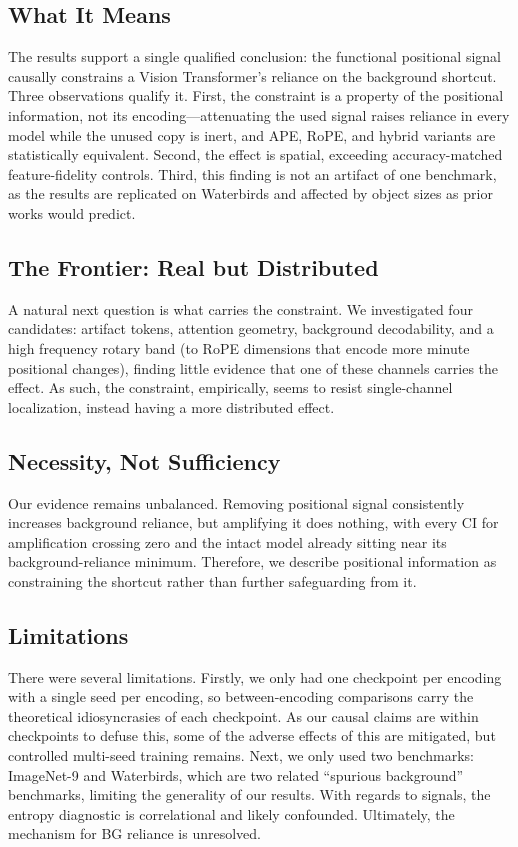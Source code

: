 \documentclass[10pt,twocolumn,letterpaper]{article}
\begin{document}
\subsection{What It Means}
The results support a single qualified conclusion: the functional positional signal causally constrains a Vision Transformer's reliance on the background shortcut. Three observations qualify it. First, the constraint is a property of the positional information, not its encoding---attenuating the used signal raises reliance in every model while the unused copy is inert, and APE, RoPE, and hybrid variants are statistically equivalent. Second, the effect is spatial, exceeding accuracy-matched feature-fidelity controls. Third, this finding is not an artifact of one benchmark, as the results are replicated on Waterbirds and affected by object sizes as prior works would predict.

\subsection{The Frontier: Real but Distributed}
A natural next question is what carries the constraint. We investigated four candidates: artifact tokens, attention geometry, background decodability, and a high frequency rotary band (to RoPE dimensions that encode more minute positional changes), finding little evidence that one of these channels carries the effect. As such, the constraint, empirically, seems to resist single-channel localization, instead having a more distributed effect.

\subsection{Necessity, Not Sufficiency}
Our evidence remains unbalanced. Removing positional signal consistently increases background reliance, but amplifying it does nothing, with every CI for amplification crossing zero and the intact model already sitting near its background-reliance minimum. Therefore, we describe positional information as constraining the shortcut rather than further safeguarding from it.

\subsection{Limitations}
\label{sec:limitations}
There were several limitations. Firstly, we only had one checkpoint per encoding with a single seed per encoding, so between-encoding comparisons carry the theoretical idiosyncrasies of each checkpoint. As our causal claims are within checkpoints to defuse this, some of the adverse effects of this are mitigated, but controlled multi-seed training remains. Next, we only used two benchmarks: ImageNet-9 and Waterbirds, which are two related ``spurious background'' benchmarks, limiting the generality of our results. With regards to signals, the entropy diagnostic is correlational and likely confounded. Ultimately, the mechanism for BG reliance is unresolved.
\end{document}
